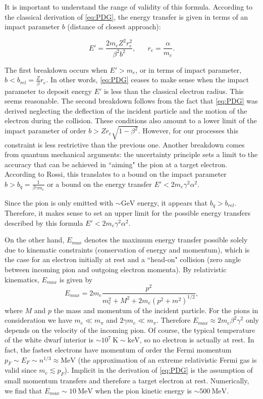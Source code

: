 \documentclass[11 pt, preprint,preprintnumbers,amsmath,amssymb, prd]{revtex4}
\begin{document}
It is important to understand the range of validity of this formula. According to the classical derivation of \ref{eq:PDG}, the energy transfer is given in terms of an impact parameter $b$ (distance of closest approach):

\begin{equation}
E' = \frac{2 m_e Z^2 r_e^2}{\beta^2 b^2}, \hspace{20pt} r_e = \frac{\alpha}{m_e}. 
\end{equation}

The first breakdown occurs when $E' > m_e$, or in terms of impact parameter, $b< b_{rel} = \frac{Z}{\beta} r_e$. In other words, \ref{eq:PDG} ceases to make sense when the impact parameter to deposit energy $E'$ is less than the classical electron radius. This seems reasonable. The second breakdown follows from the fact that \ref{eq:PDG} was derived neglecting the deflection of the incident particle and the motion of the electron during the collision. These conditions also amount to a lower limit of the impact parameter of order $b > Z r_e \sqrt{1-\beta^2}$. However, for our processes this constraint is less restrictive than the previous one. Another breakdown comes from quantum mechanical arguments: the uncertainty principle sets a limit to the accuracy that can be achieved in ``aiming" the pion at a target electron. According to Rossi, this translates to a bound on the impact parameter $b > b_q = \frac{1}{\beta \gamma m_e}$ or a bound on the energy transfer $E' < 2 m_e \gamma^2 \alpha^2$. 

Since the pion is only emitted with $\sim \text{GeV}$ energy, it appears that $b_q > b_{rel}$. Therefore, it makes sense to set an upper limit for the possible energy transfers described by this formula $E' < 2 m_e \gamma^2 \alpha^2$. 

On the other hand, $E_{max}$ denotes the maximum energy transfer possible solely due to kinematic constraints (conservation of energy and momentum), which is the case for an electron initially at rest and a ``head-on" collision (zero angle between incoming pion and outgoing electron momenta). By relativistic kinematics, $E_{max}$ is given by 
\begin{equation}
E_{max} = 2 m_e \frac{p^2}{m_e^2 + M^2 + 2m_e (p^2 +m^2)^{1/2}},
\end{equation}
where $M$ and $p$ the mass and momentum of the incident particle. For the pions in consideration we have $m_e \ll m_\pi$ and $2 \gamma m_e \ll m_\pi$. Therefore $E_{max} \approx 2 m_e \beta^2 \gamma^2$ only depends on the velocity of the incoming pion. Of course, the typical temperature of the white dwarf interior is $\sim 10^{7} ~\text{K} \sim \text{keV}$, so no electron is actually at rest. In fact, the fastest electrons have momentum of order the Fermi momentum $p_F \sim E_F \sim n^{1/3} \approx \text{MeV}$ (the approximation of an extreme relativistic Fermi gas is valid since $m_e \lesssim p_F$). Implicit in the derivation of \ref{eq:PDG} is the assumption of small momentum transfers and therefore a target electron at rest. Numerically, we find that $E_{max} \sim 10 ~\text{MeV}$ when the pion kinetic energy is $\sim 500 ~\text{MeV}$. 
\end{document}
